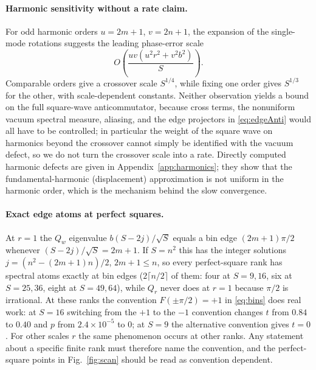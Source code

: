 \documentclass[11pt,a4paper]{article}
\begin{document}
\paragraph{Harmonic sensitivity without a rate claim.}
For odd harmonic orders $u=2m+1$, $v=2n+1$, the expansion of the single-mode rotations suggests the leading phase-error scale
\begin{equation}
O\!\left(\frac{uv(u^2r^2+v^2b^2)}{S}\right).
\label{eq:heur}
\end{equation}
Comparable orders give a crossover scale $S^{1/4}$, while fixing one order gives $S^{1/3}$ for the other, with scale-dependent constants. Neither observation yields a bound on the full square-wave anticommutator, because cross terms, the nonuniform vacuum spectral measure, aliasing, and the edge projectors in \eqref{eq:edgeAnti} would all have to be controlled; in particular the weight of the square wave on harmonics beyond the crossover cannot simply be identified with the vacuum defect, so we do not turn the crossover scale into a rate. Directly computed harmonic defects are given in Appendix~\ref{app:harmonics}; they show that the fundamental-harmonic (displacement) approximation is not uniform in the harmonic order, which is the mechanism behind the slow convergence.

\paragraph{Exact edge atoms at perfect squares.}
At $r=1$ the $Q_w$ eigenvalue $b(S-2j)/\sqrt S$ equals a bin edge $(2m+1)\pi/2$ whenever $(S-2j)/\sqrt S=2m+1$. If $S=n^2$ this has the integer solutions $j=(n^2-(2m+1)n)/2$, $2m+1\le n$, so every perfect-square rank has spectral atoms exactly at bin edges ($2\lceil n/2\rceil$ of them: four at $S=9,16$, six at $S=25,36$, eight at $S=49,64$), while $Q_r$ never does at $r=1$ because $\pi/2$ is irrational. At these ranks the convention $F(\pm\pi/2)=+1$ in \eqref{eq:bins} does real work: at $S=16$ switching from the $+1$ to the $-1$ convention changes $t$ from $0.84$ to $0.40$ and $p$ from $2.4\times10^{-5}$ to $0$; at $S=9$ the alternative convention gives $t=0$. For other scales $r$ the same phenomenon occurs at other ranks. Any statement about a specific finite rank must therefore name the convention, and the perfect-square points in Fig.~\ref{fig:scan} should be read as convention dependent.
\end{document}
